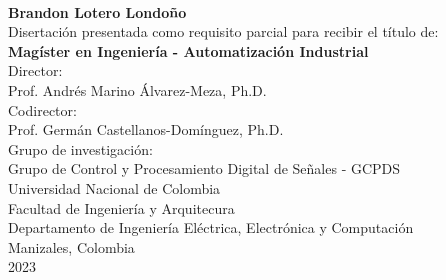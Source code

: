 \begin{center}

  \thispagestyle{empty}
  \vspace*{2cm}

  \begin{spacing}{1.9}
    \textbf{\huge \thesistitlees}\\[1.0cm]
  \end{spacing}

  \Large
  \textbf{Brandon Lotero Londoño}\\[2.0cm]

  \small
  Disertación presentada como requisito parcial para recibir el título de:\\
  \textbf{Magíster en Ingeniería - Automatización Industrial}\\[1cm]

  Director:\\
  Prof. Andrés Marino Álvarez-Meza,
  Ph.D.\\[0.25cm]

  Codirector:\\
  Prof. Germán Castellanos-Domínguez,
  Ph.D.\\[1cm]

  Grupo de investigación:\\
  Grupo de Control y Procesamiento Digital de Señales - GCPDS \\[1cm]

  Universidad Nacional de Colombia\\
  Facultad de Ingeniería y Arquitecura\\
  Departamento de Ingeniería Eléctrica, Electrónica y Computación\\
  Manizales, Colombia\\
  2023\\

\end{center}

\restoregeometry